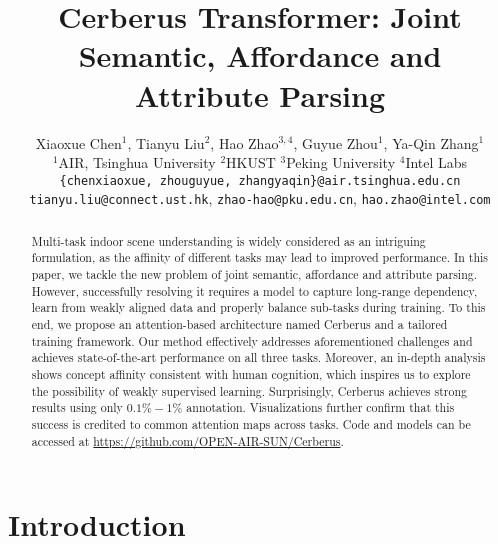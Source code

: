 \documentclass[10pt,twocolumn,letterpaper]{article}
\begin{document}
\title{Cerberus Transformer: Joint Semantic, Affordance and Attribute Parsing
}

\author{Xiaoxue Chen$^{1}$, Tianyu Liu$^2$, Hao Zhao$^{3,4}$, Guyue Zhou$^1$, Ya-Qin Zhang$^1$ \\
	$^1$AIR, Tsinghua University $^2$HKUST $^3$Peking University $^4$Intel Labs\\
	{\tt\small \{chenxiaoxue, zhouguyue, zhangyaqin\}@air.tsinghua.edu.cn}\\
	{\tt\small tianyu.liu@connect.ust.hk}, {\tt\small zhao-hao@pku.edu.cn}, {\tt\small hao.zhao@intel.com}}
	


\maketitle

\begin{abstract}
Multi-task indoor scene understanding is widely considered as an intriguing formulation, as the affinity of different tasks may lead to improved performance. In this paper, we tackle the new problem of joint semantic, affordance and attribute parsing. However, successfully resolving it requires a model to capture long-range dependency, learn from weakly aligned data and properly balance sub-tasks during training. To this end, we propose an attention-based architecture named Cerberus and a tailored training framework. Our method effectively addresses aforementioned challenges and achieves state-of-the-art performance on all three tasks. Moreover, an in-depth analysis shows concept affinity consistent with human cognition, which inspires us to explore the possibility of weakly supervised learning. Surprisingly, Cerberus achieves strong results using only $0.1\%-1\%$ annotation. Visualizations further confirm that this success is credited to common attention maps across tasks. Code and models can be accessed at \url{https://github.com/OPEN-AIR-SUN/Cerberus}.
\end{abstract}

\section{Introduction}
\label{sec:intro}
\end{document}
